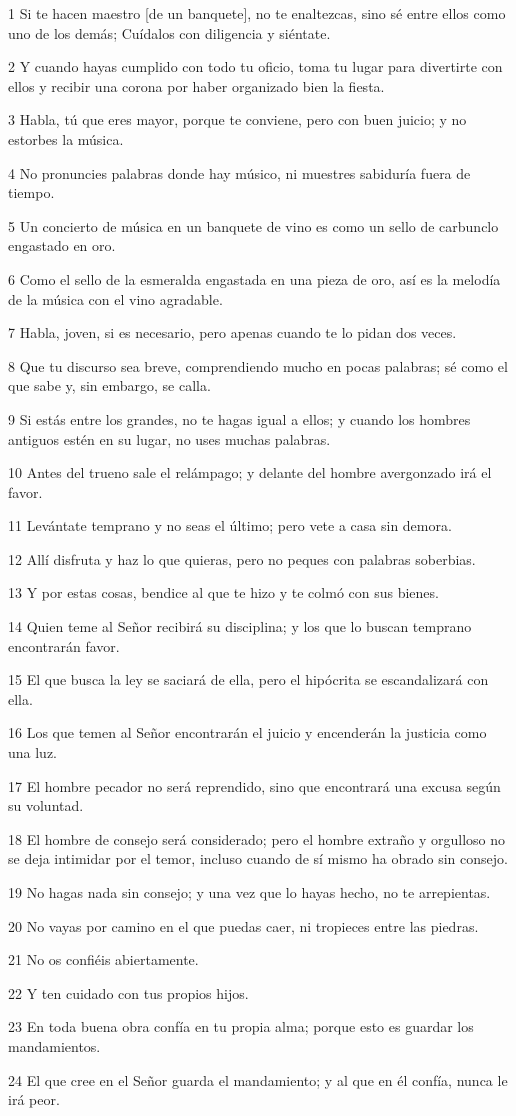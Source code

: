 \par 1 Si te hacen maestro [de un banquete], no te enaltezcas, sino sé entre ellos como uno de los demás; Cuídalos con diligencia y siéntate.
\par 2 Y cuando hayas cumplido con todo tu oficio, toma tu lugar para divertirte con ellos y recibir una corona por haber organizado bien la fiesta.
\par 3 Habla, tú que eres mayor, porque te conviene, pero con buen juicio; y no estorbes la música.
\par 4 No pronuncies palabras donde hay músico, ni muestres sabiduría fuera de tiempo.
\par 5 Un concierto de música en un banquete de vino es como un sello de carbunclo engastado en oro.
\par 6 Como el sello de la esmeralda engastada en una pieza de oro, así es la melodía de la música con el vino agradable.
\par 7 Habla, joven, si es necesario, pero apenas cuando te lo pidan dos veces.
\par 8 Que tu discurso sea breve, comprendiendo mucho en pocas palabras; sé como el que sabe y, sin embargo, se calla.
\par 9 Si estás entre los grandes, no te hagas igual a ellos; y cuando los hombres antiguos estén en su lugar, no uses muchas palabras.
\par 10 Antes del trueno sale el relámpago; y delante del hombre avergonzado irá el favor.
\par 11 Levántate temprano y no seas el último; pero vete a casa sin demora.
\par 12 Allí disfruta y haz lo que quieras, pero no peques con palabras soberbias.
\par 13 Y por estas cosas, bendice al que te hizo y te colmó con sus bienes.
\par 14 Quien teme al Señor recibirá su disciplina; y los que lo buscan temprano encontrarán favor.
\par 15 El que busca la ley se saciará de ella, pero el hipócrita se escandalizará con ella.
\par 16 Los que temen al Señor encontrarán el juicio y encenderán la justicia como una luz.
\par 17 El hombre pecador no será reprendido, sino que encontrará una excusa según su voluntad.
\par 18 El hombre de consejo será considerado; pero el hombre extraño y orgulloso no se deja intimidar por el temor, incluso cuando de sí mismo ha obrado sin consejo.
\par 19 No hagas nada sin consejo; y una vez que lo hayas hecho, no te arrepientas.
\par 20 No vayas por camino en el que puedas caer, ni tropieces entre las piedras.
\par 21 No os confiéis abiertamente.
\par 22 Y ten cuidado con tus propios hijos.
\par 23 En toda buena obra confía en tu propia alma; porque esto es guardar los mandamientos.
\par 24 El que cree en el Señor guarda el mandamiento; y al que en él confía, nunca le irá peor.

